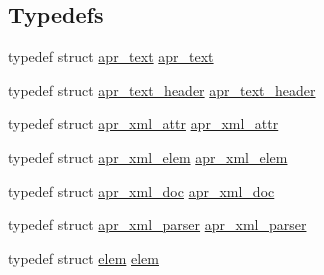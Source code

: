 \subsection*{Typedefs}
\begin{DoxyCompactItemize}
\item 
typedef struct \hyperlink{structapr__text}{apr\+\_\+text} \hyperlink{group__APR__Util__XML_gafddd251818de0015559bc174f81fd743}{apr\+\_\+text}
\item 
typedef struct \hyperlink{structapr__text__header}{apr\+\_\+text\+\_\+header} \hyperlink{group__APR__Util__XML_gaafc6d5ebd59b64a27146cf938a4086e0}{apr\+\_\+text\+\_\+header}
\item 
typedef struct \hyperlink{structapr__xml__attr}{apr\+\_\+xml\+\_\+attr} \hyperlink{group__APR__Util__XML_ga4889d4d353f0ea0dabae2d5ae58dd07e}{apr\+\_\+xml\+\_\+attr}
\item 
typedef struct \hyperlink{structapr__xml__elem}{apr\+\_\+xml\+\_\+elem} \hyperlink{group__APR__Util__XML_ga31390d11ec04137c925ddf43c2223270}{apr\+\_\+xml\+\_\+elem}
\item 
typedef struct \hyperlink{structapr__xml__doc}{apr\+\_\+xml\+\_\+doc} \hyperlink{group__APR__Util__XML_ga98eba70878b9460f2530e7a21bb6ae74}{apr\+\_\+xml\+\_\+doc}
\item 
typedef struct \hyperlink{structapr__xml__parser}{apr\+\_\+xml\+\_\+parser} \hyperlink{group__APR__Util__XML_gab08a1c255615afda782318811a5053d9}{apr\+\_\+xml\+\_\+parser}
\item 
typedef struct \hyperlink{structelem}{elem} \hyperlink{group__APR__Util__XML_gaf6c0c31c62555e73fa50b02e1393afc2}{elem}
\end{DoxyCompactItemize}
